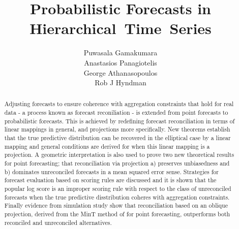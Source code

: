 \documentclass[a4paper, 11pt]{article}
\title{Probabilistic Forecasts in Hierarchical~Time~Series}
\author{Puwasala Gamakumara\\ Anastasios Panagiotelis\\ George Athanasopoulos\\ Rob J Hyndman}
\theoremstyle{theo}
\theoremstyle{definition}
\begin{document}
  
\maketitle

\begin{abstract}
  Adjusting forecasts to ensure coherence with aggregation constraints that hold for real data - a process known as forecast reconiliation - is extended from point forecasts to probabilistic forecasts.  This is achieved by redefining forecast reconciliation in terms of linear mappings in general, and projections more specifically.  New theorems establish that the true predictive distribution can be recovered in the elliptical case by a linear mapping and general conditions are derived for when this linear mapping is a projection. A geometric interpretation is also used to prove two new theoretical results for point forecasting; that  reconciliation via projection a) preserves unbiasedness and b) dominates unreconciled forecasts in a mean squared error sense.  Strategies for forecast evaluation based on scoring rules are discussed and it is shown that the popular log score is an improper scoring rule with respect to the class of unreconciled forecasts when the true predictive disstribution coheres with aggregation constraints.  Finally evidence from simulation study show that reconciliation based on an oblique projection, derived from the MinT method of \cite{Wickramasuriya2017} for point forecasting, outperforms both reconciled and unreconciled alternatives.
\end{abstract}

%
\end{document}
